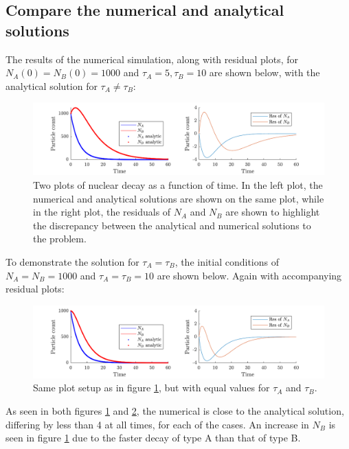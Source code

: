 \documentclass[a4paper,10pt]{article} 	%
\numberwithin{equation}{section}
\begin{document}
	\subsection{Compare the numerical and analytical solutions}
	The results of the numerical simulation, along with residual plots, for $ N_A(0) = N_B(0) = 1000 $ and $ \tau_A = 5, \tau_B = 10 $ are shown below, with the analytical solution for $ \tau_A \neq \tau_B $:
	\begin{figure}[H]
		\centering
		\includegraphics[width=\linewidth]{unequaltau.pdf}
		\caption{Two plots of nuclear decay as a function of time. In the left plot, the numerical and analytical solutions are shown on the same plot, while in the right plot, the residuals of $ N_A $ and $ N_B $ are shown to highlight the discrepancy between the analytical and numerical solutions to the problem.}
		\label{fig:unequalTau}
	\end{figure}
	To demonstrate the solution for $ \tau_A = \tau_B $, the initial conditions of $ N_A=N_B = 1000 $ and $ \tau_A=\tau_B = 10 $ are shown below. Again with accompanying residual plots:
	\begin{figure}[H]
		\centering
		\includegraphics[width=\linewidth]{equaltau.pdf}
		\caption{Same plot setup as in figure \ref{fig:unequalTau}, but with equal values for $ \tau_A $ and $ \tau_B $.}
		\label{fig:equalTau}
	\end{figure}
	As seen in both figures \ref{fig:unequalTau} and \ref{fig:equalTau}, the numerical is close to the analytical solution, differing by less than 4 at all times, for each of the cases. An increase in $ N_B $ is seen in figure \ref{fig:unequalTau} due to the faster decay of type A than that of type B.
 	
\end{document}
